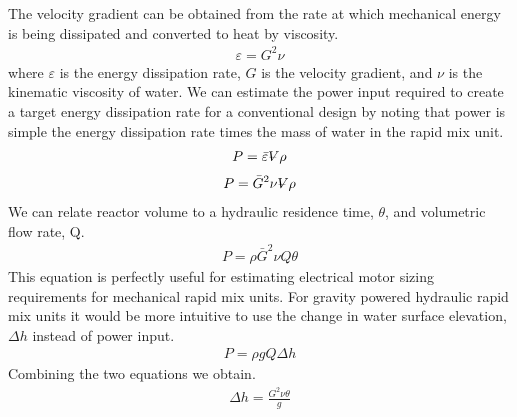 \documentclass[letterpaper,10pt,english]{sphinxmanual}
\begin{document}
The velocity gradient can be obtained from the rate at which mechanical energy is being dissipated and converted to heat by viscosity.
\begin{equation}\label{equation:Rapid_Mix/RM_Theory_and_Future_Work:Rapid_Mix/RM_Theory_and_Future_Work:30}
\begin{split}\varepsilon = G^2 \nu\end{split}
\end{equation}
where \(\varepsilon\) is the energy dissipation rate, \(G\) is the velocity gradient, and \(\nu\) is the kinematic viscosity of water. We can estimate the power input required to create a target energy dissipation rate for a conventional design by noting that power is simple the energy dissipation rate times the mass of water in the rapid mix unit.
\begin{equation}\label{equation:Rapid_Mix/RM_Theory_and_Future_Work:Rapid_Mix/RM_Theory_and_Future_Work:31}
\begin{split}P = \bar\varepsilon \rlap{\kern.08em--}V \rho\end{split}
\end{equation}\begin{equation}\label{equation:Rapid_Mix/RM_Theory_and_Future_Work:Rapid_Mix/RM_Theory_and_Future_Work:32}
\begin{split}P = \bar G^2 \nu \rlap{\kern.08em--}V \rho\end{split}
\end{equation}
We can relate reactor volume to a hydraulic residence time, \(\theta\), and volumetric flow rate, Q.
\begin{equation}\label{equation:Rapid_Mix/RM_Theory_and_Future_Work:Rapid_Mix/RM_Theory_and_Future_Work:33}
\begin{split}P = \rho \bar G^2 \nu Q \theta\end{split}
\end{equation}
This equation is perfectly useful for estimating electrical motor sizing requirements for mechanical rapid mix units. For gravity powered hydraulic rapid mix units it would be more intuitive to use the change in water surface elevation, \(\Delta h\) instead of power input.
\begin{equation}\label{equation:Rapid_Mix/RM_Theory_and_Future_Work:Rapid_Mix/RM_Theory_and_Future_Work:34}
\begin{split}P = \rho g Q \Delta h\end{split}
\end{equation}
Combining the two equations we obtain.
\begin{equation}\label{equation:Rapid_Mix/RM_Theory_and_Future_Work:Rapid_Mix/RM_Theory_and_Future_Work:35}
\begin{split}\Delta h =   \frac{G^2 \nu \theta}{g}\end{split}
\end{equation}
\end{document}
